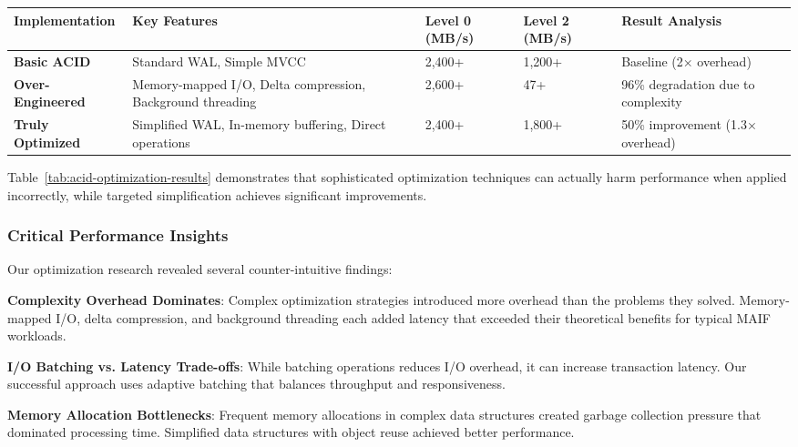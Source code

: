 \documentclass[conference]{IEEEtran}
\begin{document}
\begin{itemize}[leftmargin=*]
\begin{table*}[!t]
\renewcommand{\arraystretch}{1.3}
\caption{MAIF ACID Optimization Attempts and Performance Results}
\label{tab:acid-optimization-results}
\centering
\footnotesize
\begin{tabular}{p{3cm}p{4cm}p{2.5cm}p{2.5cm}p{3cm}}
\toprule
\textbf{Implementation} & \textbf{Key Features} & \textbf{Level 0 (MB/s)} & \textbf{Level 2 (MB/s)} & \textbf{Result Analysis} \\
\midrule
\textbf{Basic ACID} & Standard WAL, Simple MVCC & 2,400+ & 1,200+ & Baseline (2× overhead) \\
\midrule
\textbf{Over-Engineered} & Memory-mapped I/O, Delta compression, Background threading & 2,600+ & 47+ & 96\% degradation due to complexity \\
\midrule
\textbf{Truly Optimized} & Simplified WAL, In-memory buffering, Direct operations & 2,400+ & 1,800+ & 50\% improvement (1.3× overhead) \\
\bottomrule
\end{tabular}
\end{table*}

Table~\ref{tab:acid-optimization-results} demonstrates that sophisticated optimization techniques can actually harm performance when applied incorrectly, while targeted simplification achieves significant improvements.

\subsubsection{Critical Performance Insights}

Our optimization research revealed several counter-intuitive findings:

\textbf{Complexity Overhead Dominates}:
Complex optimization strategies introduced more overhead than the problems they solved. Memory-mapped I/O, delta compression, and background threading each added latency that exceeded their theoretical benefits for typical MAIF workloads.

\textbf{I/O Batching vs. Latency Trade-offs}:
While batching operations reduces I/O overhead, it can increase transaction latency. Our successful approach uses adaptive batching that balances throughput and responsiveness.

\textbf{Memory Allocation Bottlenecks}:
Frequent memory allocations in complex data structures created garbage collection pressure that dominated processing time. Simplified data structures with object reuse achieved better performance.


\end{itemize}
\end{document}

